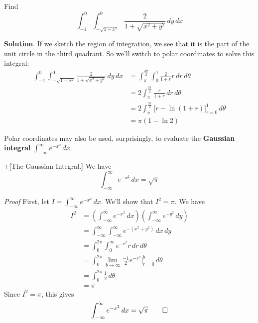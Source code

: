 \documentclass[10pt,]{book}
\makeatletter
\newcommand{\terminology}[1]{\textbf{#1}}
\theoremstyle{ptxplainnotitle}
\theoremstyle{ptxplaintitle}
\theoremstyle{ptxplainnotitle}
\theoremstyle{ptxplaintitle}
\theoremstyle{ptxplainnotitle}
\theoremstyle{ptxplaintitle}
\renewcommand*{\proofname}{Proof}
\renewenvironment{proof}[1][\proofname]{\par
  \pushQED{\qed}%
  \normalfont \topsep6\p@\@plus6\p@\relax
  \trivlist
  \item\relax
    {\itshape
    #1\@addpunct{.}}\hspace\labelsep\ignorespaces
}{%
  \popQED\endtrivlist\@endpefalse
}
\theoremstyle{ptxdefinitionnotitle}
\theoremstyle{ptxdefinitiontitle}
\theoremstyle{ptxdefinitionnotitle}
\theoremstyle{ptxdefinitiontitle}
\theoremstyle{ptxdefinitionnotitle}
\theoremstyle{ptxdefinitiontitle}
\theoremstyle{ptxdefinitionnotitle}
\theoremstyle{ptxdefinitiontitle}
\theoremstyle{ptxdefinitionnotitle}
\theoremstyle{ptxdefinitiontitle}
\numberwithin{equation}{section}
\makeatother
\begin{document}
\begin{example}\label{example-integrating-over-a-circular-sector}
\hypertarget{p-1145}{}%
Find%
\begin{equation*}
\int_{-1}^{0}\int_{-\sqrt{1-x^{2}}}^{0}\frac{2}{1+\sqrt{x^{2} + y^{2}}}\,dy\,dx
\end{equation*}
%
\par\smallskip%
\noindent\textbf{Solution}.\hypertarget{solution-182}{}\quad%
\hypertarget{p-1146}{}%
If we sketch the region of integration, we see that it is the part of the unit circle in the third quadrant. So we'll switch to polar coordinates to solve this integral:%
\begin{align*}
\int_{-1}^{0}\int_{-\sqrt{1-x^{2}}}^{0}\frac{2}{1+\sqrt{x^{2} + y^{2}}}\,dy\,dx & = \int_{\pi}^{\frac{3\pi}{2}}\int_{0}^{1}\frac{2}{1+r}r\,dr\,d\theta \\
& = 2\int_{\pi}^{\frac{3\pi}{2}} \frac{r}{1+r}\,dr\,d\theta \\
& = 2\int_{\pi}^{\frac{3\pi}{2}} \bigg[r - \ln(1+r)\bigg]_{r=0}^{1}\,d\theta \\
& = \pi(1-\ln2) 
\end{align*}
%
\end{example}
\hypertarget{p-1147}{}%
Polar coordinates may also be used, surprisingly, to evaluate the \terminology{Gaussian integral} \(\int_{-\infty}^{\infty}e^{-x^{2}}\,dx\).%
\begin{theorem}+[{The Gaussian Integral.}]\label{theorem-the-gaussian-integral}
\hypertarget{p-1148}{}%
We have%
\begin{equation*}
\int_{-\infty}^{\infty}e^{-x^{2}}\,dx = \sqrt{\pi}
\end{equation*}
%
\end{theorem}
\begin{proof}\hypertarget{proof-15}{}
\hypertarget{p-1149}{}%
First, let \(I = \int_{-\infty}^{\infty}e^{-x^{2}}\,dx\). We'll show that \(I^{2} = \pi\). We have%
\begin{align*}
I^{2} & = \left(\int_{-\infty}^{\infty}e^{-x^{2}}\,dx\right)\left(\int_{-\infty}^{\infty}e^{-y^{2}}\,dy\right) \\
& = \int_{-\infty}^{\infty}\int_{-\infty}^{\infty}e^{-(x^{2} + y^{2})}\,dx\,dy \\
& = \int_{0}^{2\pi}\int_{0}^{\infty}e^{-r^{2}}r\,dr\,d\theta \\
& = \int_{0}^{2\pi} \lim_{b\to\infty}\frac{-1}{2}e^{-r^{2}}\bigg]_{r=0}^{b}\,d\theta \\
& = \int_{0}^{2\pi} \frac{1}{2}\,d\theta \\
& = \pi 
\end{align*}
Since \(I^{2} = \pi\), this gives%
\begin{equation*}
\int_{-\infty}^{\infty}e^{-x^{2}}\,dx = \sqrt{\pi}\qedhere
\end{equation*}
%
\end{proof}
\end{document}
